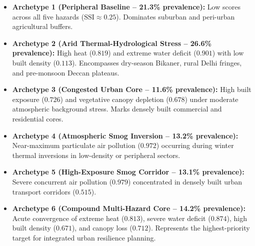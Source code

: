 \begin{itemize}
    \item \textbf{Archetype 1 (Peripheral Baseline -- 21.3\% prevalence):} Low scores across all five hazards ($\text{SSI} \approx 0.25$). Dominates suburban and peri-urban agricultural buffers.
    \item \textbf{Archetype 2 (Arid Thermal-Hydrological Stress -- 26.6\% prevalence):} High heat ($0.819$) and extreme water deficit ($0.901$) with low built density ($0.113$). Encompasses dry-season Bikaner, rural Delhi fringes, and pre-monsoon Deccan plateaus.
    \item \textbf{Archetype 3 (Congested Urban Core -- 11.6\% prevalence):} High built exposure ($0.726$) and vegetative canopy depletion ($0.678$) under moderate atmospheric background stress. Marks densely built commercial and residential cores.
    \item \textbf{Archetype 4 (Atmospheric Smog Inversion -- 13.2\% prevalence):} Near-maximum particulate air pollution ($0.972$) occurring during winter thermal inversions in low-density or peripheral sectors.
    \item \textbf{Archetype 5 (High-Exposure Smog Corridor -- 13.1\% prevalence):} Severe concurrent air pollution ($0.979$) concentrated in densely built urban transport corridors ($0.515$).
    \item \textbf{Archetype 6 (Compound Multi-Hazard Core -- 14.2\% prevalence):} Acute convergence of extreme heat ($0.813$), severe water deficit ($0.874$), high built density ($0.671$), and canopy loss ($0.712$). Represents the highest-priority target for integrated urban resilience planning.
\end{itemize}
